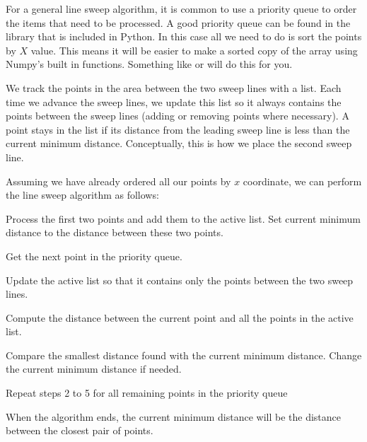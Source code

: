 For a general line sweep algorithm, it is common to use a priority queue to order the items that need to be processed.
A good priority queue can be found in the library  that is included in Python. 
In this case all we need to do is sort the points by $X$ value.
This means it will be easier to make a sorted copy of the array using Numpy's built in functions.
Something like  or  will do this for you. 

We track the points in the area between the two sweep lines with a list.
Each time we advance the sweep lines, we update this list so it always contains the points between the sweep lines (adding or removing points where necessary).
A point stays in the list if its distance from the leading sweep line is less than the current minimum distance.
Conceptually, this is how we place the second sweep line.

Assuming we have already ordered all our points by $x$ coordinate, we can perform the line sweep algorithm as follows:

\vspace{5mm}
\begin{compactenum}[1.]
\item 
Process the first two points and add them to the active list.
Set current minimum distance to the distance between these two points.
\item 
Get the next point in the priority queue.
\item 
Update the active list so that it contains only the points between the two sweep lines.
\item 
Compute the distance between the current point and all the points in the active list.
\item 
Compare the smallest distance found with the current minimum distance. 
Change the current minimum distance if needed.
\item 
Repeat steps 2 to 5 for all remaining points in the priority queue
\end{compactenum}
\vspace{5mm}

When the algorithm ends, the current minimum distance will be the distance between the closest pair of points.

